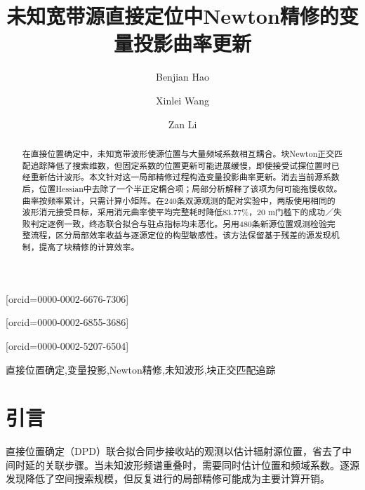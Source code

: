 \documentclass[a4paper,12pt,review]{cas-sc}
\begin{document}
\let\WriteBookmarks\relax
{}
\title[mode=title]{未知宽带源直接定位中Newton精修的变量投影曲率更新}
\author[inst1]{Benjian Hao}[orcid=0000-0002-6676-7306]
\author[inst1]{Xinlei Wang}[orcid=0000-0002-6855-3686]
\author[inst1]{Zan Li}[orcid=0000-0002-5207-6504]
\cormark[1]
\begin{abstract}
在直接位置确定中，未知宽带波形使源位置与大量频域系数相互耦合。块Newton正交匹配追踪降低了搜索维数，但固定系数的位置更新可能进展缓慢，即使接受试探位置时已经重新估计波形。本文针对这一局部精修过程构造变量投影曲率更新。消去当前源系数后，位置Hessian中去除了一个半正定耦合项；局部分析解释了该项为何可能拖慢收敛。曲率按频率累计，只需计算小矩阵。在240条双源观测的配对实验中，两版使用相同的波形消元接受目标，采用消元曲率使平均完整耗时降低83.77\%，20 m门槛下的成功／失败判定逐例一致，终态联合拟合与驻点指标均未恶化。另用480条新源位置观测检验完整流程，区分局部效率收益与逐源定位的构型敏感性。该方法保留基于残差的源发现机制，提高了块精修的计算效率。
\end{abstract}
\begin{keywords}
直接位置确定\sep 变量投影\sep Newton精修\sep 未知波形\sep 块正交匹配追踪
\end{keywords}
\maketitle

\section{引言}
直接位置确定（DPD）联合拟合同步接收站的观测以估计辐射源位置，省去了中间时延的关联步骤\cite{ChenHudsonYao2002,WeissAmar2005}。当未知波形频谱重叠时，需要同时估计位置和频域系数。逐源发现降低了空间搜索规模，但反复进行的局部精修可能成为主要计算开销。
\end{document}
